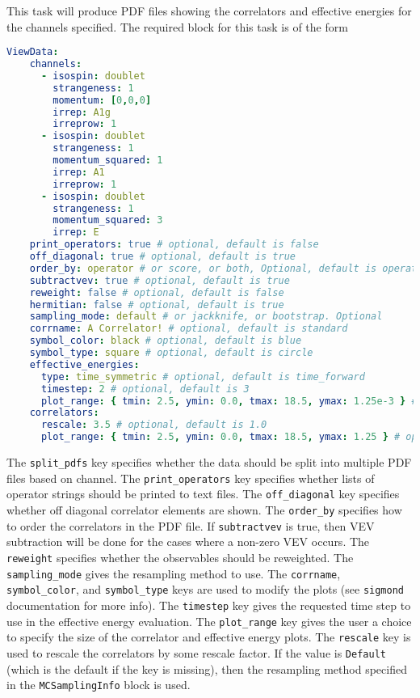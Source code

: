 \documentclass[12pt,letterpaper,notitlepage]{article}
\newcommand{\key}[1]{\textcolor{Emerald}{\texttt{\small{#1}}}}
\newcommand{\sigmond}{\texttt{sigmond}}
\begin{document}
This task will produce \textsc{PDF} files showing the correlators and effective energies for the channels specified.
The required block for this task is of the form
\begin{lstlisting}[language=yaml]
  ViewData:
    channels:
      - isospin: doublet
        strangeness: 1
        momentum: [0,0,0]
        irrep: A1g
        irreprow: 1
      - isospin: doublet
        strangeness: 1
        momentum_squared: 1
        irrep: A1
        irreprow: 1
      - isospin: doublet
        strangeness: 1
        momentum_squared: 3
        irrep: E
    print_operators: true # optional, default is false
    off_diagonal: true # optional, default is true
    order_by: operator # or score, or both, Optional, default is operator
    subtractvev: true # optional, default is true
    reweight: false # optional, default is false
    hermitian: false # optional, default is true
    sampling_mode: default # or jackknife, or bootstrap. Optional
    corrname: A Correlator! # optional, default is standard
    symbol_color: black # optional, default is blue
    symbol_type: square # optional, default is circle
    effective_energies:
      type: time_symmetric # optional, default is time_forward
      timestep: 2 # optional, default is 3
      plot_range: { tmin: 2.5, ymin: 0.0, tmax: 18.5, ymax: 1.25e-3 } # optional
    correlators:
      rescale: 3.5 # optional, default is 1.0
      plot_range: { tmin: 2.5, ymin: 0.0, tmax: 18.5, ymax: 1.25 } # optional
\end{lstlisting}
The \key{split\_pdfs} key specifies whether the data should be split into multiple \textsc{PDF} files based on channel.
The \key{print\_operators} key specifies whether lists of operator strings should be printed to text files.
The \key{off\_diagonal} key specifies whether off diagonal correlator elements are shown.
The \key{order\_by} specifies how to order the correlators in the \textsc{PDF} file.
If \key{subtractvev} is true, then VEV subtraction will be done for the cases where a non-zero VEV occurs.
The \key{reweight} specifies whether the observables should be reweighted.
The \key{sampling\_mode} gives the resampling method to use.
The \key{corrname}, \key{symbol\_color}, and \key{symbol\_type} keys are used to modify the plots (see \sigmond{} documentation for more info).
The \key{timestep} key gives the requested time step to use in the effective energy evaluation.
The \key{plot\_range} key gives the user a choice to specify the size of the correlator and effective energy plots.
The \key{rescale} key is used to rescale the correlators by some rescale factor.
If the value is \texttt{Default} (which is the default if the key is missing), then the resampling method specified in the \key{MCSamplingInfo} block is used.
\end{document}

